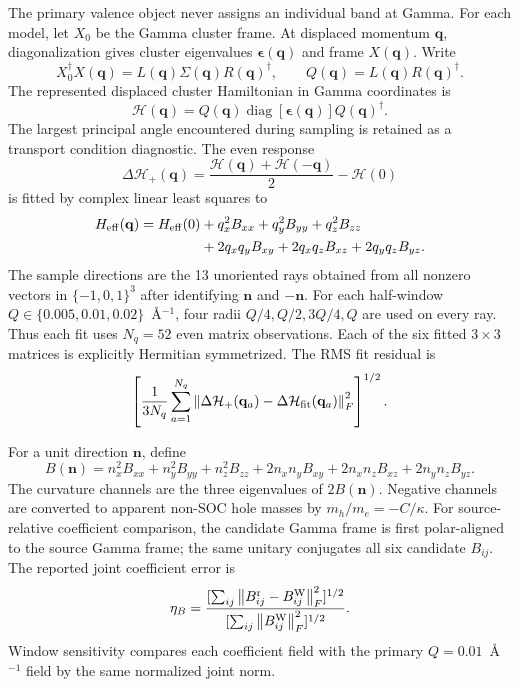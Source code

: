\documentclass[11pt]{article}
\theoremstyle{definition}
\newcommand{\norm}[1]{\left\lVert#1\right\rVert}
\newcommand{\qvec}{\mathbf q}
\begin{document}
The primary valence object never assigns an individual band at Gamma.  For each model,
let $X_0$ be the Gamma cluster frame.  At displaced momentum $\qvec$, diagonalization
gives cluster eigenvalues $\boldsymbol\epsilon(\qvec)$ and frame $X(\qvec)$.  Write
\begin{equation}
 X_0^\dagger X(\qvec)=L(\qvec)\Sigma(\qvec)R(\qvec)^\dagger,
 \qquad Q(\qvec)=L(\qvec)R(\qvec)^\dagger.
 \label{eq:cluster-polar}
\end{equation}
The represented displaced cluster Hamiltonian in Gamma coordinates is
\begin{equation}
 \mathcal H(\qvec)=Q(\qvec)\operatorname{diag}
 [\boldsymbol\epsilon(\qvec)]Q(\qvec)^\dagger.
 \label{eq:transported-cluster}
\end{equation}
The largest principal angle encountered during sampling is retained as a transport
condition diagnostic.  The even response
\begin{equation}
 \Delta\mathcal H_{+}(\qvec)=\frac{\mathcal H(\qvec)+\mathcal H(-\qvec)}{2}
 -\mathcal H(0)
 \label{eq:even-cluster-field}
\end{equation}
is fitted by complex linear least squares to
\begin{align}
 H_{\rm eff}(\qvec)=H_{\rm eff}(0)
 &+q_x^2B_{xx}+q_y^2B_{yy}+q_z^2B_{zz}\nonumber\\
 &+2q_xq_yB_{xy}+2q_xq_zB_{xz}+2q_yq_zB_{yz}.
 \label{eq:valence-effective}
\end{align}
The sample directions are the 13 unoriented rays obtained from all nonzero vectors in
$\{-1,0,1\}^3$ after identifying $\mathbf n$ and $-\mathbf n$.  For each half-window
$Q\in\{0.005,0.01,0.02\}$~\AA$^{-1}$, four radii
$Q/4,Q/2,3Q/4,Q$ are used on every ray.  Thus each fit uses
$N_q=52$ even matrix observations.  Each of the six fitted $3\times3$ matrices is
explicitly Hermitian symmetrized.  The RMS
fit residual is
\begin{equation}
 \left[\frac{1}{3N_q}\sum_{a=1}^{N_q}
 \norm{\Delta\mathcal H_{+}(\qvec_a)-\Delta\mathcal H_{\rm fit}(\qvec_a)}_F^2
 \right]^{1/2}.
 \label{eq:multiband-fit-residual}
\end{equation}

For a unit direction $\mathbf n$, define
\begin{equation}
 B(\mathbf n)=n_x^2B_{xx}+n_y^2B_{yy}+n_z^2B_{zz}
 +2n_xn_yB_{xy}+2n_xn_zB_{xz}+2n_yn_zB_{yz}.
 \label{eq:direction-contraction}
\end{equation}
The curvature channels are the three eigenvalues of $2B(\mathbf n)$.  Negative channels
are converted to apparent non-SOC hole masses by $m_h/m_e=-C/\kappa$.  For source-relative
coefficient comparison, the candidate Gamma frame is first polar-aligned to the source
Gamma frame; the same unitary conjugates all six candidate $B_{ij}$.  The reported joint
coefficient error is
\begin{equation}
 \eta_B=\frac{
 [\sum_{ij}\norm{B^{\rm r}_{ij}-B^{\rm W}_{ij}}_F^2]^{1/2}}
 {[\sum_{ij}\norm{B^{\rm W}_{ij}}_F^2]^{1/2}}.
 \label{eq:quadratic-coefficient-error}
\end{equation}
Window sensitivity compares each coefficient field with the primary
$Q=0.01$~\AA$^{-1}$ field by the same normalized joint norm.
\end{document}
